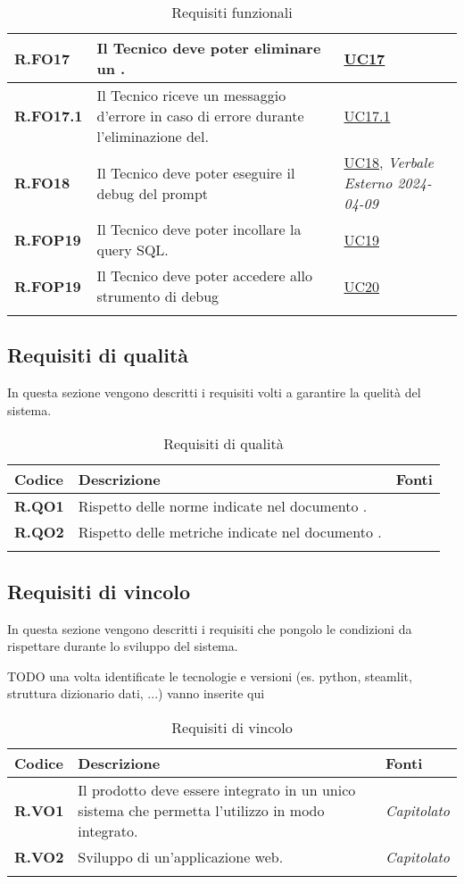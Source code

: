 \begin{longtable}{|P{3cm}|P{6,5cm}|>{\arraybackslash}P{4cm}|}
    \hline
    \textbf{R.FO17} & Il Tecnico deve poter eliminare un . &  \hyperref[UC17]{UC17}\\
    \hline
    \textbf{R.FO17.1} & Il Tecnico riceve un messaggio d'errore in caso di errore durante l'eliminazione del. &  \hyperref[UC17point1]{UC17.1}\\
    \hline
    \textbf{R.FO18} & Il Tecnico deve poter eseguire il debug del prompt &  \hyperref[UC18]{UC18}, \emph{Verbale Esterno 2024-04-09}\\
    \hline
    \textbf{R.FOP19} & Il Tecnico deve poter incollare la query SQL. &  \hyperref[UC19]{UC19}\\
    \hline
    \textbf{R.FOP19} & Il Tecnico deve poter accedere allo strumento di debug &  \hyperref[UC20]{UC20}\\ %
    \hline
\caption{Requisiti funzionali}
\label{requisitifunzionali}
\end{longtable}

\subsection{Requisiti di qualità}
In questa sezione vengono descritti i requisiti volti a garantire la quelità del sistema.

\begin{longtable}{|P{3cm}|P{6,5cm}|>{\arraybackslash}P{4cm}|}
  \hline
  \textbf{Codice} & \textbf{Descrizione} & \textbf{Fonti} \\
  \hline
  \textbf{R.QO1} & Rispetto delle norme indicate nel documento \NdP{}. & \NdP{} \\
  \hline
  \textbf{R.QO2} & Rispetto delle metriche indicate nel documento \PdQ{}. & \NdP{} \\
  \hline
\caption{Requisiti di qualità}
\label{requisitiqualita}
\end{longtable}

\subsection{Requisiti di vincolo}
In questa sezione vengono descritti i requisiti che pongolo le condizioni da rispettare durante lo sviluppo del sistema.

TODO una volta identificate le tecnologie e versioni (es. python, steamlit, struttura dizionario dati, ...) vanno inserite qui
\begin{longtable}{|P{3cm}|P{6,5cm}|>{\arraybackslash}P{4cm}|}
  \hline
  \textbf{Codice} & \textbf{Descrizione} & \textbf{Fonti} \\
  \hline
  \textbf{R.VO1} & Il prodotto deve essere integrato in un unico sistema che permetta l'utilizzo in modo integrato. & \emph{Capitolato} \\
  \hline
  \textbf{R.VO2} & Sviluppo di un'applicazione web. & \emph{Capitolato} \\
  \hline
\caption{Requisiti di vincolo}
\label{requisitivincolo}
\end{longtable}

